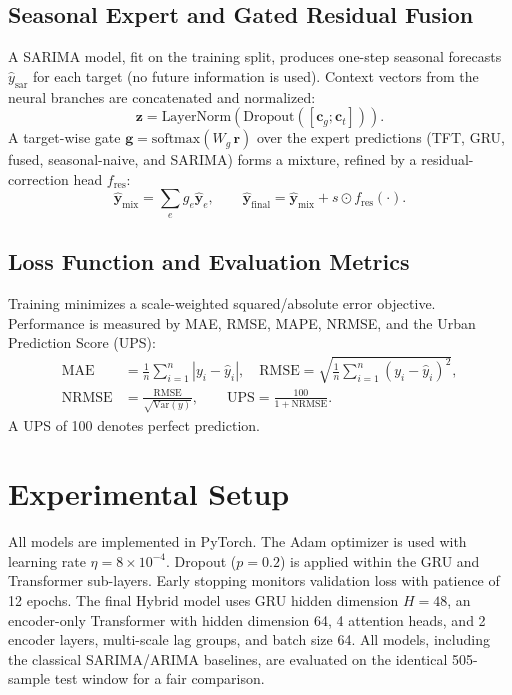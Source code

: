 \documentclass[conference]{IEEEtran}
\begin{document}
\subsection{Seasonal Expert and Gated Residual Fusion}
A SARIMA model, fit on the training split, produces one-step seasonal forecasts $\hat{y}_{\text{sar}}$ for each target (no future information is used). Context vectors from the neural branches are concatenated and normalized:
\begin{equation}
\mathbf{z} = \text{LayerNorm}(\text{Dropout}([\mathbf{c}_g; \mathbf{c}_t])).
\end{equation}
A target-wise gate $\mathbf{g} = \text{softmax}(W_g\,\mathbf{r})$ over the expert predictions (TFT, GRU, fused, seasonal-naive, and SARIMA) forms a mixture, refined by a residual-correction head $f_{\text{res}}$:
\begin{equation}
\hat{\mathbf{y}}_{\text{mix}} = \textstyle\sum_e g_e \hat{\mathbf{y}}_e, \qquad
\hat{\mathbf{y}}_{\text{final}} = \hat{\mathbf{y}}_{\text{mix}} + s \odot f_{\text{res}}(\cdot).
\end{equation}

\subsection{Loss Function and Evaluation Metrics}
Training minimizes a scale-weighted squared/absolute error objective. Performance is measured by MAE, RMSE, MAPE, NRMSE, and the Urban Prediction Score (UPS):
\begin{align}
\text{MAE} &= \tfrac{1}{n}\sum_{i=1}^{n}|y_i-\hat{y}_i|,\quad
\text{RMSE} = \sqrt{\tfrac{1}{n}\sum_{i=1}^{n}(y_i-\hat{y}_i)^2},\\
\text{NRMSE} &= \frac{\text{RMSE}}{\sqrt{\text{Var}(y)}}, \qquad
\text{UPS} = \frac{100}{1+\text{NRMSE}}.
\end{align}
A UPS of 100 denotes perfect prediction.

\section{Experimental Setup}
All models are implemented in PyTorch. The Adam optimizer is used with learning rate $\eta{=}8\times10^{-4}$. Dropout ($p{=}0.2$) is applied within the GRU and Transformer sub-layers. Early stopping monitors validation loss with patience of 12 epochs. The final Hybrid model uses GRU hidden dimension $H{=}48$, an encoder-only Transformer with hidden dimension 64, 4 attention heads, and 2 encoder layers, multi-scale lag groups, and batch size 64. All models, including the classical SARIMA/ARIMA baselines, are evaluated on the identical 505-sample test window for a fair comparison.
\end{document}
